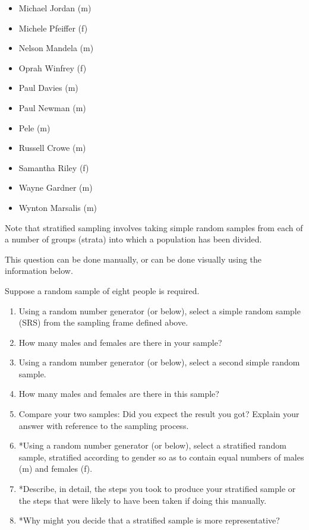 \documentclass[
]{book}
\providecommand{\tightlist}{%
  \setlength{\itemsep}{0pt}\setlength{\parskip}{0pt}}
\begin{document}
\begin{itemize}
\tightlist
\item
  Michael Jordan (m)\\
\item
  Michele Pfeiffer (f)\\
\item
  Nelson Mandela (m)\\
\item
  Oprah Winfrey (f)\\
\item
  Paul Davies (m)\\
\item
  Paul Newman (m)\\
\item
  Pele (m)\\
\item
  Russell Crowe (m)\\
\item
  Samantha Riley (f)\\
\item
  Wayne Gardner (m)\\
\item
  Wynton Marsalis (m)
\end{itemize}

Note that stratified sampling involves taking simple random samples from each of a number of groups (strata) into which a population has been divided.

This question can be done manually, or can be done visually using the information below.

Suppose a random sample of eight people is required.

\begin{enumerate}
\def\labelenumi{(\alph{enumi})}
\item
  Using a random number generator (or below), select a simple random sample (SRS) from the sampling frame defined above.
\item
  How many males and females are there in your sample?
\item
  Using a random number generator (or below), select a second simple random sample.
\item
  How many males and females are there in this sample?
\item
  Compare your two samples: Did you expect the result you got? Explain your answer with reference to the sampling process.
\item
  *Using a random number generator (or below), select a stratified random sample, stratified according to gender so as to contain equal numbers of males (m) and females (f).
\item
  *Describe, in detail, the steps you took to produce your stratified sample or the steps that were likely to have been taken if doing this manually.
\item
  *Why might you decide that a stratified sample is more representative?
\end{enumerate}
\end{document}
